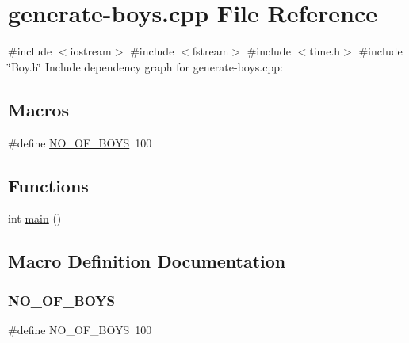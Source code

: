 \hypertarget{generate-boys_8cpp}{}\section{generate-\/boys.cpp File Reference}
\label{generate-boys_8cpp}
{\ttfamily \#include $<$iostream$>$}\newline
{\ttfamily \#include $<$fstream$>$}\newline
{\ttfamily \#include $<$time.\+h$>$}\newline
{\ttfamily \#include \char`\"{}Boy.\+h\char`\"{}}\newline
Include dependency graph for generate-\/boys.cpp\+:
\subsection*{Macros}
\begin{DoxyCompactItemize}
\item 
\#define \hyperlink{generate-boys_8cpp_aea84add592537d8213d93dd43ad974c4}{N\+O\+\_\+\+O\+F\+\_\+\+B\+O\+YS}~100
\end{DoxyCompactItemize}
\subsection*{Functions}
\begin{DoxyCompactItemize}
\item 
int \hyperlink{generate-boys_8cpp_ae66f6b31b5ad750f1fe042a706a4e3d4}{main} ()
\end{DoxyCompactItemize}


\subsection{Macro Definition Documentation}
\mbox{\label{generate-boys_8cpp_aea84add592537d8213d93dd43ad974c4}} 
\subsubsection{\texorpdfstring{N\+O\+\_\+\+O\+F\+\_\+\+B\+O\+YS}{NO\_OF\_BOYS}}
{\footnotesize\ttfamily \#define N\+O\+\_\+\+O\+F\+\_\+\+B\+O\+YS~100}



